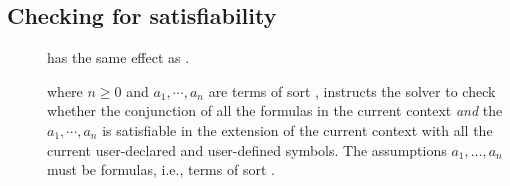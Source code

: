 \subsection{Checking for satisfiability} \label{sec:checking-for-sat}

\begin{description}

%
\item[] has the same effect as .
\smallskip





%
\item[] where $n \geq 0$
and $a_1, \cdots, a_n$ are terms of sort ,
%
instructs the solver to check whether the conjunction of all the formulas 
in the current context \emph{and} the  $a_1, \cdots, a_n$
is satisfiable in the extension of the current context with all the current 
user-declared and user-defined symbols.
The assumptions $a_1, \ldots, a_n$ must be formulas, i.e., terms of sort
.


\end{description}

